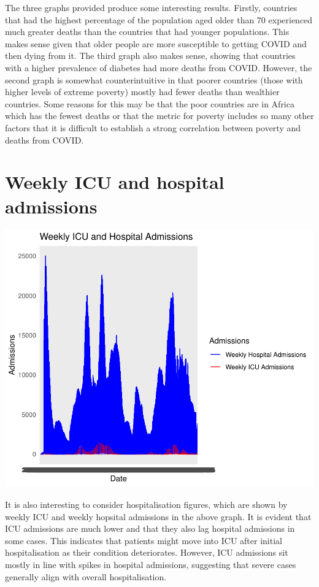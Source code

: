 \documentclass[11pt,preprint, authoryear]{elsarticle}
\numberwithin{equation}{section}
\numberwithin{figure}{section}
\numberwithin{table}{section}
\begin{document}
The three graphs provided produce some interesting results. Firstly,
countries that had the highest percentage of the population aged older
than 70 experienced much greater deaths than the countries that had
younger populations. This makes sense given that older people are more
susceptible to getting COVID and then dying from it. The third graph
also makes sense, showing that countries with a higher prevalence of
diabetes had more deaths from COVID. However, the second graph is
somewhat counterintuitive in that poorer countries (those with higher
levels of extreme poverty) mostly had fewer deaths than wealthier
countries. Some reasons for this may be that the poor countries are in
Africa which has the fewest deaths or that the metric for poverty
includes so many other factors that it is difficult to establish a
strong correlation between poverty and deaths from COVID.

\hypertarget{weekly-icu-and-hospital-admissions}{%
\section{Weekly ICU and hospital
admissions}\label{weekly-icu-and-hospital-admissions}}

\includegraphics{Question-1_files/figure-latex/unnamed-chunk-6-1.pdf}

It is also interesting to consider hospitalisation figures, which are
shown by weekly ICU and weekly hopsital admissions in the above graph.
It is evident that ICU admissions are much lower and that they also lag
hospital admissions in some cases. This indicates that patients might
move into ICU after initial hospitalisation as their condition
deteriorates. However, ICU admissions sit mostly in line with spikes in
hospital admissions, suggesting that severe cases generally align with
overall hospitalisation.


\end{document}
